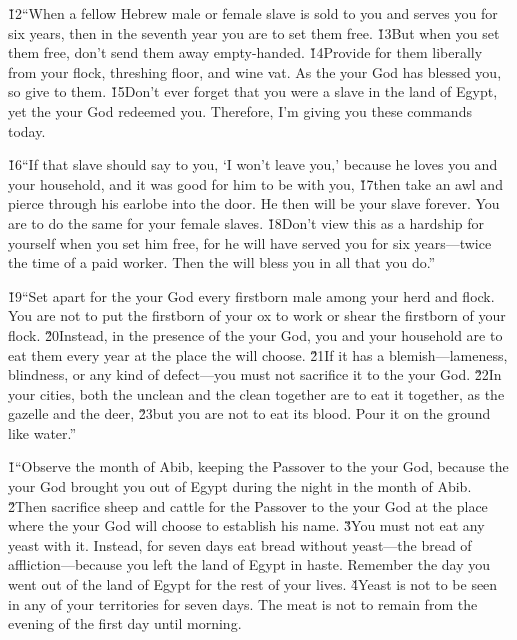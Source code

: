 \v{12}``When a fellow Hebrew male or female slave is sold to you and serves you for six years, then in the seventh year you are to set them free. \v{13}But when you set them free, don't send them away empty-handed. \v{14}Provide for them liberally from your flock, threshing floor, and wine vat. As the  your God has blessed you, so give to them. \v{15}Don't ever forget that you were a slave in the land of Egypt, yet the  your God redeemed you. Therefore, I'm giving you these commands today.

\v{16}``If that slave should say to you, `I won't leave you,' because he loves you and your household, and it was good for him to be with you, \v{17}then take an awl and pierce through his earlobe into the door. He then will be your slave forever. You are to do the same for your female slaves. \v{18}Don't view this as a hardship for yourself when you set him free, for he will have served you for six years---twice the time of a paid worker. Then the  will bless you in all that you do.''

\v{19}``Set apart for the  your God every firstborn male among your herd and flock. You are not to put the firstborn of your ox to work or shear the firstborn of your flock. \v{20}Instead, in the presence of the  your God, you and your household are to eat them every year at the place the  will choose. \v{21}If it has a blemish---lameness, blindness, or any kind of defect---you must not sacrifice it to the  your God. \v{22}In your cities, both the unclean and the clean together are to eat it together, as the gazelle and the deer, \v{23}but you are not to eat its blood. Pour it on the ground like water.''

\v{1}``Observe the month of Abib, keeping the Passover to the  your God, because the  your God brought you out of Egypt during the night in the month of Abib. \v{2}Then sacrifice sheep and cattle for the Passover to the  your God at the place where the  your God will choose to establish his name. \v{3}You must not eat any yeast with it. Instead, for seven days eat bread without yeast---the bread of affliction---because you left the land of Egypt in haste. Remember the day you went out of the land of Egypt for the rest of your lives. \v{4}Yeast is not to be seen in any of your territories for seven days. The meat is not to remain from the evening of the first day until morning.

